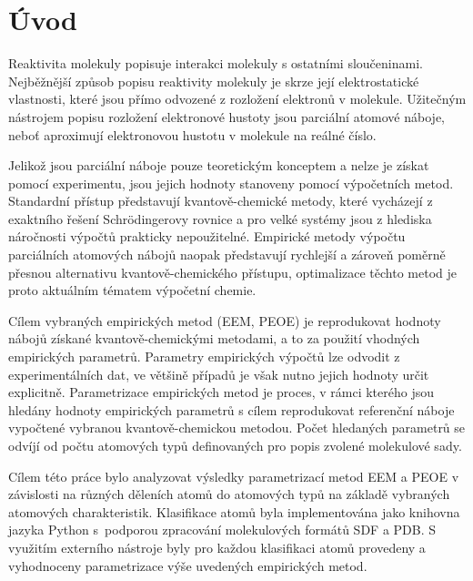 \chapter{Úvod}
\setcounter{page}{1}
Reaktivita molekuly popisuje interakci molekuly s ostatními sloučeninami. Nejběžnější způsob popisu reaktivity molekuly je skrze její elektrostatické vlastnosti, které jsou pří\-mo odvozené z rozložení elektronů v molekule. Užitečným nástrojem popisu rozložení elektronové hustoty jsou parciální atomové náboje, neboť aproximují elektronovou hustotu v molekule na reálné číslo.

Jelikož jsou parciální náboje pouze teoretickým konceptem a nelze je získat pomocí experimentu, jsou jejich hodnoty stanoveny pomocí výpočetních metod. Standardní přístup představují kvantově-chemické metody, které vycházejí z exaktního řešení Schrödingerovy rovnice a pro velké systémy jsou z hlediska náročnosti výpočtů prakticky nepoužitelné. Empirické metody výpočtu parciálních atomových nábojů naopak představují rychlejší a zároveň poměrně přesnou alternativu kvantově-chemické\-ho přístupu, optimalizace těchto metod je proto aktuálním tématem výpočetní chemie. 

Cílem vybraných empirických metod (EEM, PEOE) je reprodukovat hodnoty nábojů získané kvantově-chemickými metodami, a to za použití vhodných empirických parametrů. Parametry empirických výpočtů lze odvodit z experimentálních dat, ve většině případů je však nutno jejich hodnoty určit explicitně. Parametrizace empirických metod je proces, v rámci kterého jsou hledány hodnoty empirických parametrů s cílem reprodukovat referenční náboje vypočtené vybranou kvantově-chemickou metodou. Počet hledaných parametrů se odvíjí od počtu atomových typů definovaných pro popis zvolené molekulové sady. 

Cílem této práce bylo analyzovat výsledky parametrizací metod EEM a PEOE v závislosti na různých děleních atomů do atomových typů na základě vybraných atomových charakteristik. Klasifikace atomů byla implementována jako knihovna jazyka Python s~podporou zpracování molekulových formátů SDF a PDB. S využitím externího nástroje byly pro každou klasifikaci atomů provedeny a vyhodnoceny parametrizace výše uvedených empirických metod.










